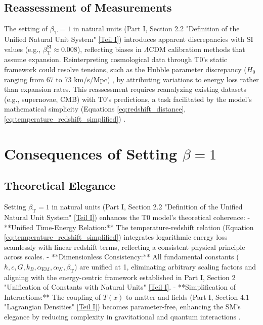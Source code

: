 \documentclass[12pt,a4paper]{article}
\newcommand{\Tfield}{T(x)}
\newcommand{\alphaEM}{\alpha_{\text{EM}}}
\newcommand{\alphaW}{\alpha_{\text{W}}}
\newcommand{\betaT}{\beta_{\text{T}}}
\begin{document}
	\subsection{Reassessment of Measurements}
	\label{subsec:reassessment_measurements}
	
	The setting of \(\betaT = 1\) in natural units (Part I, Section 2.2 "Definition of the Unified Natural Unit System" \href{https://github.com/jpascher/T0-Time-Mass-Duality/tree/main/2/pdf/English/QMRelTimeMassPart1En.pdf}{[Teil I]}) introduces apparent discrepancies with SI values (e.g., \(\betaT^{\text{SI}} \approx 0.008\)), reflecting biases in \(\Lambda\)CDM calibration methods that assume expansion. Reinterpreting cosmological data through T0’s static framework could resolve tensions, such as the Hubble parameter discrepancy (\(H_0\) ranging from 67 to 73 km/s/Mpc) \cite{DiValentino2021}, by attributing variations to energy loss rather than expansion rates. This reassessment requires reanalyzing existing datasets (e.g., supernovae, CMB) with T0’s predictions, a task facilitated by the model’s mathematical simplicity (Equations \ref{eq:redshift_distance}, \ref{eq:temperature_redshift_simplified}) \cite{pascher_alphabeta_2025}.
	
	\section{Consequences of Setting \(\beta = 1\)}
	\label{sec:consequences_beta}
	
	\subsection{Theoretical Elegance}
	\label{subsec:theoretical_elegance}
	
	Setting \(\betaT = 1\) in natural units (Part I, Section 2.2 "Definition of the Unified Natural Unit System" \href{https://github.com/jpascher/T0-Time-Mass-Duality/tree/main/2/pdf/English/QMRelTimeMassPart1En.pdf}{[Teil I]}) enhances the T0 model’s theoretical coherence:
	- **Unified Time-Energy Relation:** The temperature-redshift relation (Equation \ref{eq:temperature_redshift_simplified}) integrates logarithmic energy loss seamlessly with linear redshift terms, reflecting a consistent physical principle across scales.
	- **Dimensionless Consistency:** All fundamental constants (\(\hbar, c, G, k_B, \alphaEM, \alphaW, \betaT\)) are unified at 1, eliminating arbitrary scaling factors and aligning with the energy-centric framework established in Part I, Section 2 "Unification of Constants with Natural Units" \href{https://github.com/jpascher/T0-Time-Mass-Duality/tree/main/2/pdf/English/QMRelTimeMassPart1En.pdf}{[Teil I]}.
	- **Simplification of Interactions:** The coupling of \(\Tfield\) to matter and fields (Part I, Section 4.1 "Lagrangian Densities" \href{https://github.com/jpascher/T0-Time-Mass-Duality/tree/main/2/pdf/English/QMRelTimeMassPart1En.pdf}{[Teil I]}) becomes parameter-free, enhancing the SM’s elegance by reducing complexity in gravitational and quantum interactions \cite{pascher_alphabeta_2025}.
	
\end{document}
